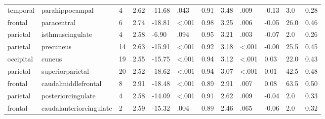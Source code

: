 \documentclass{article}
\begin{document}
\begin{longtable}{llR{1.5cm}R{1cm}R{1.3cm}R{1cm}R{1cm}R{1.3cm}R{1cm}R{1.8cm}R{1.3cm}R{1.8cm}}
  temporal &           parahippocampal &            4 &                  2.62 &           -11.68 &               .043 &                               0.91 &                          3.48 &                            .009 & -0.13 &    3.0 &      0.28 \\
   frontal &               paracentral &            6 &                  2.74 &           -18.81 &      \textless.001 &                               0.98 &                          3.25 &                            .006 & -0.05 &   26.0 &      0.46 \\
  parietal &          isthmuscingulate &            4 &                  2.58 &            -6.90 &               .094 &                               0.95 &                          3.21 &                            .003 & -0.07 &    2.0 &      0.26 \\
  parietal &                 precuneus &           14 &                  2.63 &           -15.91 &      \textless.001 &                               0.92 &                          3.18 &                   \textless.001 & -0.00 &   25.5 &      0.45 \\
 occipital &                    cuneus &           19 &                  2.55 &           -15.75 &      \textless.001 &                               0.94 &                          3.12 &                   \textless.001 &  0.03 &   22.0 &      0.43 \\
  parietal &          superiorparietal &           20 &                  2.52 &           -18.62 &      \textless.001 &                               0.94 &                          3.07 &                   \textless.001 &  0.01 &   42.5 &      0.48 \\
   frontal &       caudalmiddlefrontal &            8 &                  2.91 &           -18.48 &      \textless.001 &                               0.89 &                          2.91 &                            .007 &  0.08 &   63.5 &      0.50 \\
  parietal &        posteriorcingulate &            4 &                  2.58 &           -14.09 &      \textless.001 &                               0.91 &                          2.62 &                            .009 & -0.04 &    2.0 &      0.33 \\
   frontal &   caudalanteriorcingulate &            2 &                  2.59 &           -15.32 &               .004 &                               0.89 &                          2.46 &                            .065 & -0.06 &    2.0 &      0.32 \\

\end{longtable}
\end{document}
